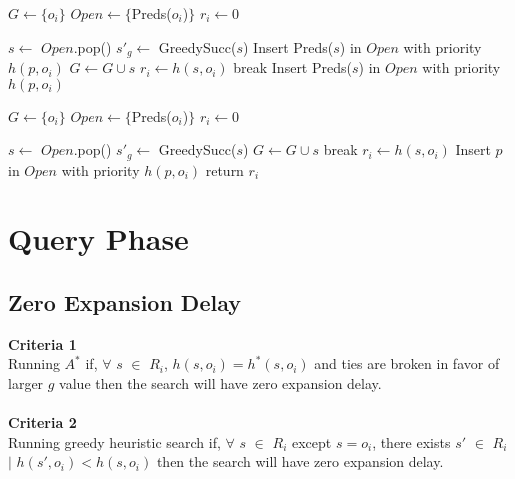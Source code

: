 \documentclass[a4paper]{article}
\begin{document}
\begin{algorithm}
\caption{}\label{alg:3}
\begin{algorithmic}[1]
\State $G \leftarrow \{o_i\}$	
\State $Open \leftarrow \{$Preds($o_i$)$\}$  
\State $r_i \leftarrow 0$

    \State $s \leftarrow$ $Open$.pop()
        \State $s'_g \leftarrow$ GreedySucc($s$)	
            \State Insert Preds($s$) in $Open$ with priority $h(p, o_i)$
            \State $G \leftarrow G \cup s$
        \Else
            \State $r_i \leftarrow h(s, o_i)$
            \State break
        \EndIf
     \Else
         \State Insert Preds($s$) in $Open$ with priority $h(p, o_i)$
     \EndIf
\EndWhile

\EndProcedure
\end{algorithmic}
\end{algorithm}

\begin{algorithm}
\caption{}\label{alg:4}
\begin{algorithmic}[1]
\State $G \leftarrow \{o_i\}$	
\State $Open \leftarrow \{$Preds($o_i$)$\}$  
\State $r_i \leftarrow 0$

    \State $s \leftarrow$ $Open$.pop()
    \State $s'_g \leftarrow$ GreedySucc($s$)	
        \State $G \leftarrow G \cup s$	
        \State break
    \EndIf
    \State $r_i \leftarrow h(s, o_i)$
        		
            \State Insert $p$ in $Open$ with priority $h(p, o_i)$
        \EndIf
    \EndFor
\EndWhile
\State return $r_i$

\EndProcedure
\end{algorithmic}
\end{algorithm}
\section{Query Phase}
\subsection{Zero Expansion Delay}
\textbf{Criteria 1}\\
Running $A^\ast$ if, $\forall$ $s$ $\in$ $R_i$, $h(s, o_i) = h^\ast(s, o_i)$ and ties are broken in favor of larger $g$ value then the search will have zero expansion delay.\\
\\
\textbf{Criteria 2}\\
Running greedy heuristic search if, $\forall$ $s$ $\in$ $R_i$ except $s=o_i$, there exists $s'$ $\in$ $R_i$ $\mid$ $h(s',o_i) < h(s,o_i)$ then the search will have zero expansion delay.
\end{document}
